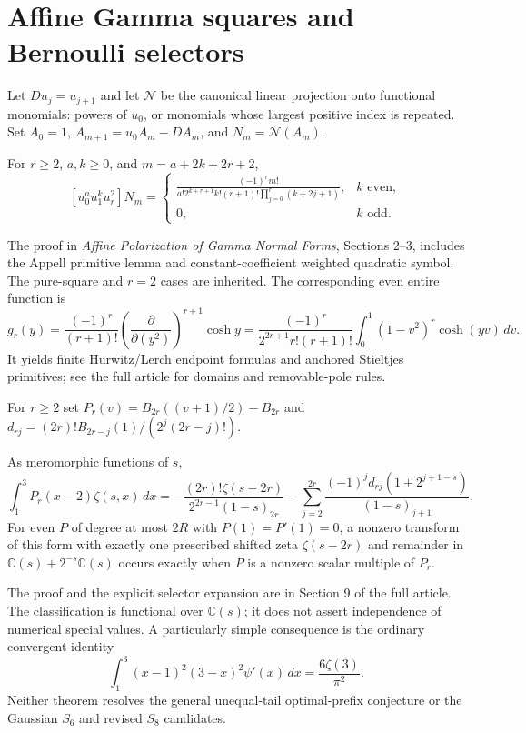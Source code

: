 \section{Affine Gamma squares and Bernoulli selectors}
\label{agint:section}
Let $D u_j=u_{j+1}$ and let $\mathcal N$ be the canonical linear
projection onto functional monomials: powers of $u_0$, or monomials
whose largest positive index is repeated. Set
$A_0=1$, $A_{m+1}=u_0A_m-DA_m$, and $N_m=\mathcal N(A_m)$.
\begin{theorem}\label{agint:squares}
For $r\ge2$, $a,k\ge0$, and $m=a+2k+2r+2$,
\[
 [u_0^au_1^ku_r^2]N_m=
 \begin{cases}
 \displaystyle\frac{(-1)^rm!}{a!2^{k+r+1}k!(r+1)!
                      \prod_{j=0}^r(k+2j+1)},&k\text{ even},\\[5pt]
 0,&k\text{ odd}.
 \end{cases}
\]
\end{theorem}
The proof in \emph{Affine Polarization of Gamma Normal Forms},
Sections 2--3, includes the Appell primitive lemma and constant-coefficient
weighted quadratic symbol. The pure-square and $r=2$ cases are inherited.
The corresponding even entire function is
\[
 g_r(y)=\frac{(-1)^r}{(r+1)!}
       \left(\frac{\partial}{\partial(y^2)}\right)^{r+1}\cosh y
 =\frac{(-1)^r}{2^{2r+1}r!(r+1)!}
       \int_0^1(1-v^2)^r\cosh(yv)\,dv.
\]
It yields finite Hurwitz/Lerch endpoint formulas and anchored Stieltjes
primitives; see the full article for domains and removable-pole rules.

For $r\ge2$ set $P_r(v)=B_{2r}((v+1)/2)-B_{2r}$ and
$d_{rj}=(2r)!B_{2r-j}(1)/(2^j(2r-j)!)$.
\begin{theorem}\label{agint:selectors}
As meromorphic functions of $s$,
\[
 \int_1^3P_r(x-2)\zeta(s,x)\,dx
 =-\frac{(2r)!\zeta(s-2r)}{2^{2r-1}(1-s)_{2r}}
  -\sum_{j=2}^{2r}\frac{(-1)^jd_{rj}(1+2^{j+1-s})}{(1-s)_{j+1}}.
\]
For even $P$ of degree at most $2R$ with $P(1)=P'(1)=0$, a nonzero
transform of this form with exactly one prescribed shifted zeta
$\zeta(s-2r)$ and remainder in $\mathbb C(s)+2^{-s}\mathbb C(s)$
occurs exactly when $P$ is a nonzero scalar multiple of $P_r$.
\end{theorem}
The proof and the explicit selector expansion are in Section 9 of the
full article. The classification is functional over $\mathbb C(s)$;
it does not assert independence of numerical special values.
A particularly simple consequence is the ordinary convergent identity
\[
 \int_1^3(x-1)^2(3-x)^2\psi'(x)\,dx=\frac{6\zeta(3)}{\pi^2}.
\]
Neither theorem resolves the general unequal-tail optimal-prefix
conjecture or the Gaussian $S_6$ and revised $S_8$ candidates.
